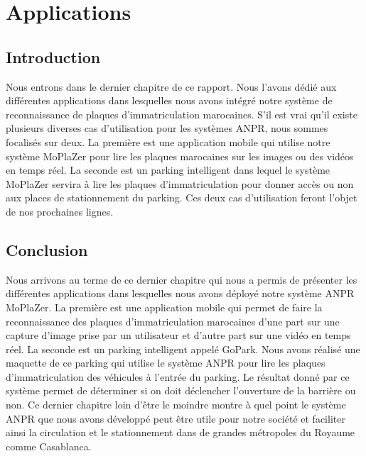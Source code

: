 \chapter{\textbf{Applications}}
    \section{Introduction}
    Nous entrons dans le dernier chapitre de ce rapport. Nous l’avons dédié aux différentes applications dans lesquelles nous avons intégré notre système de reconnaissance de plaques d’immatriculation marocaines. S’il est vrai qu’il existe plusieurs diverses cas d’utilisation pour les systèmes ANPR, nous sommes focalisés sur deux. La première est une application mobile qui utilise notre système MoPlaZer pour lire les plaques marocaines sur les images ou des vidéos en temps réel. La seconde est un parking intelligent dans lequel le système MoPlaZer servira à lire les plaques d’immatriculation pour donner accès ou non aux places de stationnement du parking. Ces deux cas d’utilisation feront l’objet de nos prochaines lignes.

    
    
    
    \section{Conclusion}
    Nous arrivons au terme de ce dernier chapitre qui nous a permis de présenter les différentes applications dans lesquelles nous avons déployé notre système ANPR MoPlaZer. La première est une application mobile qui permet de faire la reconnaissance des plaques d’immatriculation marocaines d’une part  sur une capture d’image prise par un utilisateur et d’autre part sur une vidéo en temps réel. La seconde est un parking intelligent appelé GoPark. Nous avons réalisé une maquette de ce parking qui utilise le système ANPR pour lire les plaques d’immatriculation des véhicules à l’entrée du parking. Le résultat donné par ce système permet de déterminer si on doit déclencher l’ouverture de la barrière ou non. Ce dernier chapitre loin d’être le moindre montre à quel point le système ANPR que nous avons développé peut être utile pour notre société et faciliter ainsi la circulation et le stationnement dans de grandes métropoles du Royaume comme Casablanca. 
